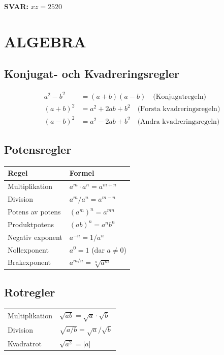 \documentclass[11pt,a4paper]{article}
\newenvironment{formelbox}{\begin{framed}\color{mainblue}}{\end{framed}}
\begin{document}
\begin{formelbox}
\textbf{SVAR:} $xz = 2520$
\end{formelbox}

\section{ALGEBRA}

\subsection{Konjugat- och Kvadreringsregler}

\begin{formelbox}
\begin{align}
a^2 - b^2 &= (a+b)(a-b) \quad \text{(Konjugatregeln)}\\
(a+b)^2 &= a^2 + 2ab + b^2 \quad \text{(Forsta kvadreringsregeln)}\\
(a-b)^2 &= a^2 - 2ab + b^2 \quad \text{(Andra kvadreringsregeln)}
\end{align}
\end{formelbox}

\subsection{Potensregler}

\begin{tabular}{|l|l|}
\hline
\textbf{Regel} & \textbf{Formel} \\
\hline
Multiplikation & $a^m \cdot a^n = a^{m+n}$ \\
Division & $a^m / a^n = a^{m-n}$ \\
Potens av potens & $(a^m)^n = a^{mn}$ \\
Produktpotens & $(ab)^n = a^n b^n$ \\
Negativ exponent & $a^{-n} = 1/a^n$ \\
Nollexponent & $a^0 = 1$ (dar $a \neq 0$) \\
Brakexponent & $a^{m/n} = \sqrt[n]{a^m}$ \\
\hline
\end{tabular}

\subsection{Rotregler}

\begin{tabular}{|l|l|}
\hline
Multiplikation & $\sqrt{ab} = \sqrt{a} \cdot \sqrt{b}$ \\
Division & $\sqrt{a/b} = \sqrt{a} / \sqrt{b}$ \\
Kvadratrot & $\sqrt{a^2} = |a|$ \\
\hline
\end{tabular}
\end{document}
